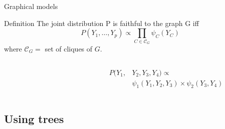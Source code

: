 \documentclass{beamer}
\newcommand{\Ccal}{\mathcal{C}}
\newcommand{\edgeunit}{1.5}
\begin{document}
\begin{frame}{Graphical models}
\begin{block}{Definition \cite{Lau96}}
	The joint distribution P is faithful to the graph G iff \[ P(Y_1, \dots, Y_p) \propto \prod_{C \in \Ccal_G} \psi_C(Y_C) \]
  where $\Ccal_G =$ set of cliques of $G$.
\end{block}
\begin{columns}
\begin{column}{0.4\linewidth}
\flushright
{}\\
\end{column}
\begin{column}{0.6\linewidth}
\begin{align*}
	P(Y_1, &Y_2, Y_3, Y_4) \propto \\ 
	& \psi_1(Y_1 ,Y_2, Y_3) \times \psi_2(Y_3, Y_4)
\end{align*} 
\end{column}
\end{columns}
\end{frame}

\subsection{Using trees}
\end{document}
